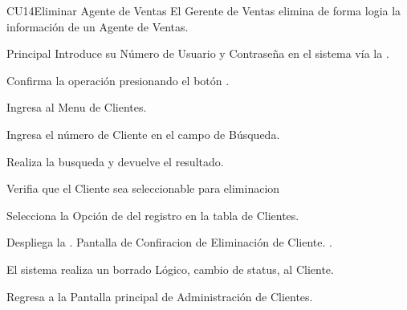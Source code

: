 
% 



\begin{UseCase}{CU14}{Eliminar Agente de Ventas}{
	El Gerente de Ventas elimina de forma logia la información de un Agente de Ventas.
}
\end{UseCase}
\begin{UCtrayectoria}{Principal}
\UCpaso[\UCactor] Introduce su Número de Usuario y Contraseña en el sistema vía la  \label{CU17Login}.

\UCpaso[\UCactor] Confirma la operación presionando el botón .

\UCpaso[\UCactor] Ingresa al Menu de Clientes.

\UCpaso[\UCactor] Ingresa el número de Cliente en el campo de Búsqueda.

\UCpaso Realiza la busqueda y devuelve el resultado.

\UCpaso[\UCactor] Verifia que el Cliente sea seleccionable para eliminacion

\UCpaso[\UCactor] Selecciona la Opción de  del registro en la tabla de Clientes.

\UCpaso Despliega la . Pantalla de Confiracion de Eliminación de Cliente.  . 

\UCpaso El sistema realiza un borrado Lógico, cambio de status, al Cliente.

\UCpaso Regresa a la Pantalla principal de Administración de Clientes.


\end{UCtrayectoria}

